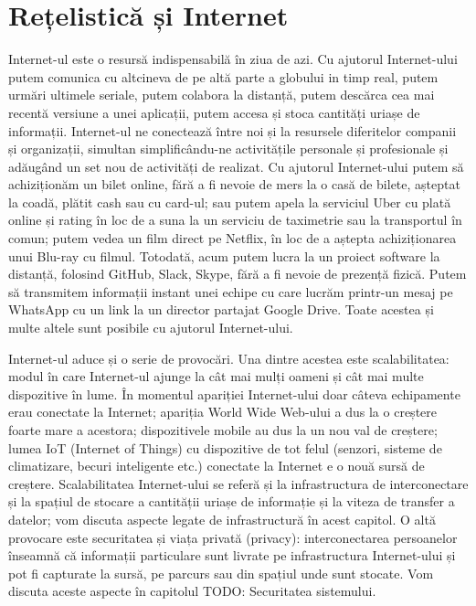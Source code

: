 \chapter{Rețelistică și Internet}
\label{chapter:net}

Internet-ul este o resursă indispensabilă în ziua de azi. Cu ajutorul Internet-ului putem comunica cu altcineva de pe altă parte a globului in timp real, putem urmări ultimele seriale, putem colabora la distanță, putem descărca cea mai recentă versiune a unei aplicații, putem accesa și stoca cantități uriașe de informații. Internet-ul ne conectează între noi și la resursele diferitelor companii și organizații, simultan simplificându-ne activitățile personale și profesionale și adăugând un set nou de activități de realizat. Cu ajutorul Internet-ului putem să achiziționăm un bilet online, fără a fi nevoie de mers la o casă de bilete, așteptat la coadă, plătit cash sau cu card-ul; sau putem apela la serviciul Uber cu plată online și rating în loc de a suna la un serviciu de taximetrie sau la transportul în comun; putem vedea un film direct pe Netflix, în loc de a aștepta achiziționarea unui Blu-ray cu filmul. Totodată, acum putem lucra la un proiect software la distanță, folosind GitHub, Slack, Skype, fără a fi nevoie de prezență fizică. Putem să transmitem informații instant unei echipe cu care lucrăm printr-un mesaj pe WhatsApp cu un link la un director partajat Google Drive. Toate acestea și multe altele sunt posibile cu ajutorul Internet-ului.

Internet-ul aduce și o serie de provocări. Una dintre acestea este scalabilitatea: modul în care Internet-ul ajunge la cât mai mulți oameni și cât mai multe dispozitive în lume. În momentul apariției Internet-ului doar câteva echipamente erau conectate la Internet; apariția World Wide Web-ului a dus la o creștere foarte mare a acestora; dispozitivele mobile au dus la un nou val de creștere; lumea IoT (Internet of Things) cu dispozitive de tot felul (senzori, sisteme de climatizare, becuri inteligente etc.) conectate la Internet e o nouă sursă de creștere. Scalabilitatea Internet-ului se referă și la infrastructura de interconectare și la spațiul de stocare a cantității uriașe de informație și la viteza de transfer a datelor; vom discuta aspecte legate de infrastructură în acest capitol. O altă provocare este securitatea și viața privată (privacy): interconectarea persoanelor înseamnă că informații particulare sunt livrate pe infrastructura Internet-ului și pot fi capturate la sursă, pe parcurs sau din spațiul unde sunt stocate. Vom discuta aceste aspecte în capitolul TODO: Securitatea sistemului.

